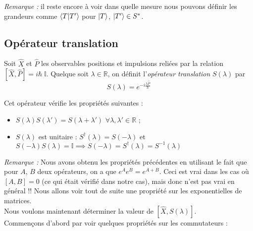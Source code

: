 \documentclass{article}
\begin{document}
\textit{Remarque :} il reste encore à voir dans quelle mesure nous pouvons définir les grandeurs comme $\braket{T|T'}$ pour $\ket{T}$, $\ket{T'} \in S^*$. 


\subsection*{Opérateur translation}

Soit $\hat{X}$ et $\hat{P}$ les observables positions et impulsions reliées par la relation $[\hat{X}, \hat{P}] = i\hbar \; \mathbb{I}$. Quelque soit $\lambda \in \mathbb{R}$, on définit l'\emph{opérateur translation} $S(\lambda)$ par
\begin{equation}
    S(\lambda) = e^{-i\frac{\lambda \hat{P}}{\hbar}}
\label{eq: operateur translation définition}
\end{equation}

Cet opérateur vérifie les propriétés suivantes : 
\begin{itemize}[label = \textbullet]
    \item $S(\lambda) S(\lambda') = S(\lambda + \lambda')$  \; $\forall \lambda, \lambda' \in \mathbb{R}$ ; 
    \item $S(\lambda)$ est unitaire : $S^\dagger (\lambda) = S(-\lambda)$ et $S(-\lambda)S(\lambda) = \mathbb{I} \implies S(-\lambda) = S^\dagger(\lambda) = S^{-1}(\lambda)$
\end{itemize}

\textit{Remarque :} Nous avons obtenu les propriétés précédentes en utilisant le fait que pour $A$, $B$ deux opérateurs, on a que $e^A e^B = e^{A+B}$. Ceci est vrai dans les cas où $[A, B] = 0$ (ce qui était vérifié dans notre cas), mais donc n'est pas vrai en général !! Nous allons voir tout de suite une propriété sur les exponentielles de matrices. \\

Nous voulons maintenant déterminer la valeur de $[\hat{X},S(\lambda)]$. \\

Commençons d'abord par voir quelques propriétés sur les commutateurs : 
\end{document}
